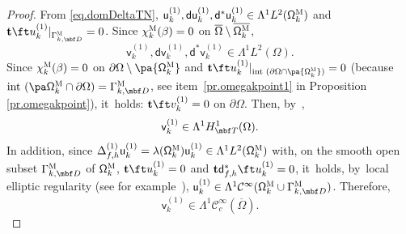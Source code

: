 \begin{proof}
From \eqref{eq.domDeltaTN}, $\mathsf u_k^{(1)}, \mathsf d \mathsf u_k^{(1)}, \mathsf d^* \mathsf u_k^{(1)}\in \Lambda^1L^{2}(\mathsf \Omega^{\textsc{M}}_k)$ and $\mathbf{t}\ft u_k^{(1)}|_{\Gamma^{\textsc{M}}_{k,\mbf D}}=0$. Since $ \chi_k^{\textsc{M}} (\beta)=0$ on $\overline{\Omega}\setminus \overline{ \mathsf \Omega_k^{\textsc{M}}}$,
\[
\text{$\mathsf v_k^{(1)}, \mathsf d \mathsf v_k^{(1)}, \mathsf d^* \mathsf v_k^{(1)}\in \Lambda^1L^{2}(\Omega)$}.
\]
Since $ \chi_k^{\textsc{M}} (\beta)=0$ on $\partial {\Omega}\setminus \pa{ \mathsf \Omega_k^{\textsc{M}}}$ and $\mathbf{t}\ft u_k^{(1)}|_{\text{int } (\partial {\Omega}\cap \pa{ \mathsf \Omega_k^{\textsc{M}}})}=0$ (because $\text{int }(\pa \mathsf \Omega_k^{\textsc{M}} \cap \partial \Omega)= {\Gamma_{k,\mbf D}^{\textsc{M}}}$, see item~\eqref{pr.omegakpoint1} in Proposition \ref{pr.omegakpoint}), it~holds: $\mathbf{t}\ft v_k^{(1)}=0$ on $\partial \Omega$.
Then, by~\cite[Lem.\,73]{DLLN},
\[
\mathsf v_k^{(1)}\in \Lambda^1H^1_{\mbf T}(\Omega).
\]
In addition, since $\Delta^{(1)}_{f,h}\mathsf u_k^{(1)}= \lambda(\mathsf \Omega_k^{\textsc{M}}) \mathsf u_k^{(1)} \in \Lambda^1L^2 (\mathsf \Omega_{k}^{\textsc{M}})$ with, on the smooth open subset $\Gamma_{k,\mbf D}^{\textsc{M}}$ of $\mathsf \Omega_{k}^{\textsc{M}}$,
$\mathbf{t}\ft u_k^{(1)}=0$ and $\mathbf{t} \mathsf d_{f,h}^*\ft u_k^{(1)}=0$, it~holds, by~local elliptic regularity (see for example~\cite{ChPi}), $\mathsf u_k^{(1)}\in\Lambda^1\mathcal C^\infty (\mathsf \Omega_{k}^{\textsc{M}} \cup \Gamma_{k,\mbf D}^{\textsc{M}})$. Therefore,
\[
\mathsf v_k^{(1)}\in\Lambda^1\mathcal C^\infty_c (\overline \Omega).
\]


\end{proof}
